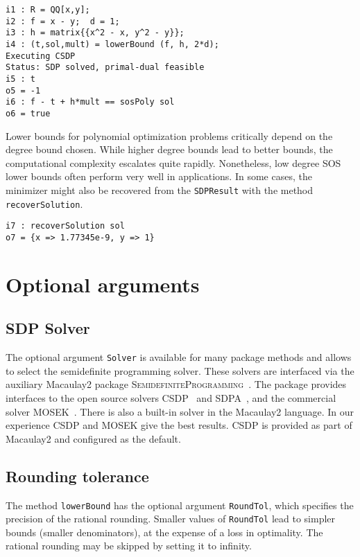 \documentclass[11pt]{amsart}
\theoremstyle{plain}%
\theoremstyle{definition}
\theoremstyle{remark}
\newcommand{\Mac}{Macaulay2\xspace}
\newcommand{\SDP}{\textsc{SemidefiniteProgramming}\xspace}
\begin{document}
{\small
\begin{verbatim}
i1 : R = QQ[x,y];
i2 : f = x - y;  d = 1;
i3 : h = matrix{{x^2 - x, y^2 - y}};
i4 : (t,sol,mult) = lowerBound (f, h, 2*d);
Executing CSDP
Status: SDP solved, primal-dual feasible
i5 : t
o5 = -1
i6 : f - t + h*mult == sosPoly sol
o6 = true
\end{verbatim}
}

Lower bounds for polynomial optimization problems critically depend on the degree bound chosen.
While higher degree bounds lead to better bounds, the computational complexity escalates quite rapidly.
Nonetheless, low degree SOS lower bounds often perform very well in applications.
In some cases, the minimizer might also be recovered from the \verb|SDPResult| with the method \verb|recoverSolution|.

{\small
\begin{verbatim}
i7 : recoverSolution sol
o7 = {x => 1.77345e-9, y => 1}
\end{verbatim}
}

\section{Optional arguments}
\label{s:arguments}

\subsection*{SDP Solver}
The optional argument \verb|Solver| is available for many package methods and allows to select the semidefinite programming solver.
These solvers are interfaced via the auxiliary Macaulay2 package \SDP~\cite{sdpM2}.
The package provides interfaces to the open source solvers CSDP~\cite{borchers1999csdp} and SDPA~\cite{yamashita2003implementation}, and the commercial solver MOSEK~\cite{mosek}.
There is also a built-in solver in the \Mac language.
In our experience CSDP and MOSEK give the best results.
CSDP is provided as part of \Mac and configured as the default.

\subsection*{Rounding tolerance}
The method \verb|lowerBound| has the optional argument \verb|RoundTol|, which specifies the precision of the rational rounding.
Smaller values of \verb|RoundTol| lead to simpler bounds (smaller denominators), at the expense of a loss in optimality.
The rational rounding may be skipped by setting it to infinity.
\end{document}
